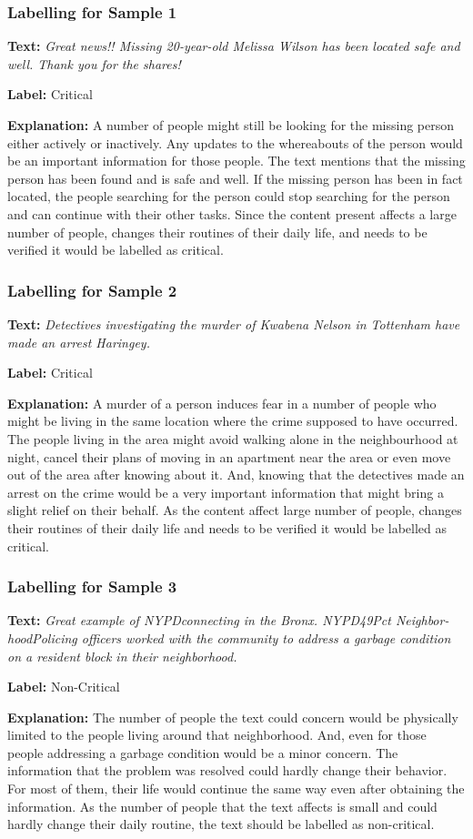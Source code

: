 \subsubsection{Labelling for Sample 1}
\textbf{Text:}
\textit{Great news!! Missing 20-year-old Melissa Wilson has been located safe and well. Thank you for the shares!}\par
\textbf{Label:} Critical\par
\textbf{Explanation:} A number of people might still be looking for the missing person either actively or inactively. Any updates to the whereabouts of the person would be an important information for those people. The text mentions that the missing person has been found and is safe and well. If the missing person has been in fact located, the people searching for the person could stop searching for the person and can continue with their other tasks. Since the content present affects a large number of people, changes their routines of their daily life, and needs to be verified it would be labelled as critical.

\subsubsection{Labelling for Sample 2}
\textbf{Text:}
\textit{Detectives investigating the murder of Kwabena Nelson in Tottenham have made an arrest Haringey.}\par
\textbf{Label:} Critical\par
\textbf{Explanation:} A murder of a person induces fear in a number of people who might be living in the same location where the crime supposed to have occurred. The people living in the area might avoid walking alone in the neighbourhood at night, cancel their plans of moving in an apartment near the area or even move out of the area after knowing about it. And, knowing that the detectives made an arrest on the crime would be a very important information that might bring a slight relief on their behalf. As the content affect large number of people, changes their routines of their daily life and needs to be verified it would be labelled as critical.

\subsubsection{Labelling for Sample 3}
\textbf{Text:}
\textit{Great example of NYPDconnecting in the Bronx. NYPD49Pct Neighbor- hoodPolicing officers worked with the community to address a garbage condition on a resident block in their neighborhood.}\par
\textbf{Label:} Non-Critical\par
\textbf{Explanation:} The number of people the text could concern would be physically limited to the people living around that neighborhood. And, even for those people addressing a garbage condition would be a minor concern. The information that the problem was resolved could hardly change their behavior. For most of them, their life would continue the same way even after obtaining the information. As the number of people that the text affects is small and could hardly change their daily routine, the text should be labelled as non-critical.

